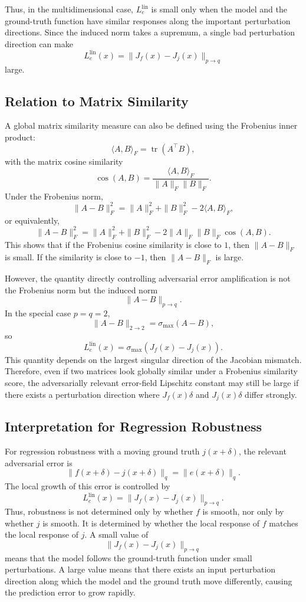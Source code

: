 \documentclass{article}
\begin{document}
Thus, in the multidimensional case, \(L_e^{\mathrm{lin}}\) is small only when the model and the ground-truth function have similar responses along the important perturbation directions. Since the induced norm takes a supremum, a single bad perturbation direction can make
\[
L_e^{\mathrm{lin}}(x)
=
\|J_f(x)-J_j(x)\|_{p\to q}
\]
large.

\subsection{Relation to Matrix Similarity}

A global matrix similarity measure can also be defined using the Frobenius inner product:
\[
\langle A,B\rangle_F
=
\operatorname{tr}(A^\top B),
\]
with the matrix cosine similarity
\[
\cos(A,B)
=
\frac{
\langle A,B\rangle_F
}{
\|A\|_F\|B\|_F
}.
\]
Under the Frobenius norm,
\[
\|A-B\|_F^2
=
\|A\|_F^2+\|B\|_F^2
-
2\langle A,B\rangle_F,
\]
or equivalently,
\[
\|A-B\|_F^2
=
\|A\|_F^2+\|B\|_F^2
-
2\|A\|_F\|B\|_F\cos(A,B).
\]
This shows that if the Frobenius cosine similarity is close to \(1\), then \(\|A-B\|_F\) is small. If the similarity is close to \(-1\), then \(\|A-B\|_F\) is large.

However, the quantity directly controlling adversarial error amplification is not the Frobenius norm but the induced norm
\[
\|A-B\|_{p\to q}.
\]
In the special case \(p=q=2\),
\[
\|A-B\|_{2\to 2}
=
\sigma_{\max}(A-B),
\]
so
\[
L_e^{\mathrm{lin}}(x)
=
\sigma_{\max}(J_f(x)-J_j(x)).
\]
This quantity depends on the largest singular direction of the Jacobian mismatch. Therefore, even if two matrices look globally similar under a Frobenius similarity score, the adversarially relevant error-field Lipschitz constant may still be large if there exists a perturbation direction where \(J_f(x)\delta\) and \(J_j(x)\delta\) differ strongly.

\subsection{Interpretation for Regression Robustness}

For regression robustness with a moving ground truth \(j(x+\delta)\), the relevant adversarial error is
\[
\|f(x+\delta)-j(x+\delta)\|_q
=
\|e(x+\delta)\|_q.
\]
The local growth of this error is controlled by
\[
L_e^{\mathrm{lin}}(x)
=
\|J_f(x)-J_j(x)\|_{p\to q}.
\]
Thus, robustness is not determined only by whether \(f\) is smooth, nor only by whether \(j\) is smooth. It is determined by whether the local response of \(f\) matches the local response of \(j\). A small value of
\[
\|J_f(x)-J_j(x)\|_{p\to q}
\]
means that the model follows the ground-truth function under small perturbations. A large value means that there exists an input perturbation direction along which the model and the ground truth move differently, causing the prediction error to grow rapidly.
\end{document}
